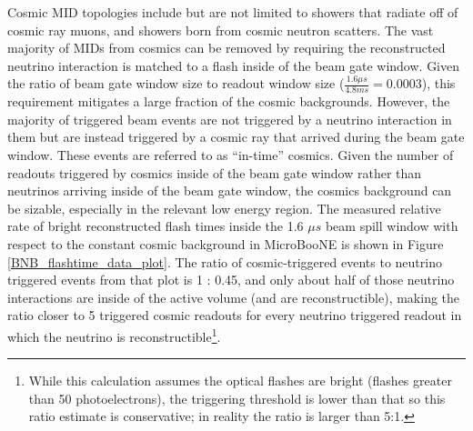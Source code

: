 Cosmic MID topologies include but are not limited to showers that radiate off of cosmic ray muons, and showers born from cosmic neutron scatters. The vast majority of MIDs from cosmics can be removed by requiring the reconstructed neutrino interaction is matched to a flash inside of the beam gate window. Given the ratio of beam gate window size to readout window size ($\frac{1.6\mu s}{4.8ms}=0.0003$), this requirement mitigates a large fraction of the cosmic backgrounds. However, the majority of triggered beam events are not triggered by a neutrino interaction in them but are instead triggered by a cosmic ray that arrived during the beam gate window. These events are referred to as ``in-time'' cosmics. Given the number of readouts triggered by cosmics inside of the beam gate window rather than neutrinos arriving inside of the beam gate window, the cosmics background can be sizable, especially in the relevant low energy region. The measured relative rate of bright reconstructed flash times inside the 1.6 $\mu s$ beam spill window with respect to the constant cosmic background in MicroBooNE is shown in Figure \ref{BNB_flashtime_data_plot}. The ratio of cosmic-triggered events to neutrino triggered events from that plot is 1 : 0.45, and only about half of those neutrino interactions are inside of the active volume (and are reconstructible), making the ratio closer to 5 triggered cosmic readouts for every neutrino triggered readout in which the neutrino is reconstructible\footnote{While this calculation assumes the optical flashes are bright (flashes greater than 50 photoelectrons), the triggering threshold is lower than that so this ratio estimate is conservative; in reality the ratio is larger than 5:1.}.\\%


